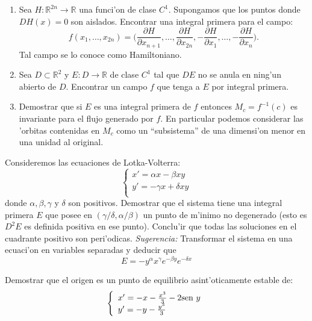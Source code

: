 \begin{ejercicio}
\begin{enumerate}
\item Sea $H:\mathbb{R}^{2n}\to\mathbb{R}$ una funci'on de clase
$C^1$. Supongamos que los puntos donde $DH(x)=0$ son aislados.
Encontrar una integral primera para el campo:
\[
    f(x_1,\ldots,x_{2n})= \bigg(\frac{\partial H}{\partial
    x_{n+1}},\ldots, \frac{\partial H}{\partial x_{2n}},
    -\frac{\partial H}{\partial x_{1}},\ldots,
    -\frac{\partial H}{\partial x_{n}} \bigg).
\]
Tal campo se lo conoce como Hamiltoniano.

\item Sea $D\subset\mathbb{R}^2$ y $E:D\to\mathbb{R}$  de clase
$C^1$ tal que $DE$ no se anula en ning'un abierto de $D$.
Encontrar un campo $f$ que tenga a $E$ por integral primera.


\item Demostrar que si $E$ es una integral primera de $f$ entonces
$M_c=f^{-1}(c)$ es invariante para el flujo generado por $f$. En
particular podemos considerar las 'orbitas contenidas en $M_c$
como un ``subsistema'' de una dimensi'on menor en una unidad al
original.



\end{enumerate}


\end{ejercicio}


\begin{ejercicio} Consideremos las ecuaciones de Lotka-Volterra:
\[
    \left\{%
\begin{array}{ll}
    x'=\alpha x-\beta x y\\
    y'=-\gamma x + \delta x y\\
\end{array}%
\right.
\]
donde $\alpha, \beta,\gamma$ y $ \delta$ son positivos. Demostrar
que el sistema tiene una integral primera $E$ que posee en
$(\gamma/\delta, \alpha/\beta)$
 un punto de m'inimo no degenerado (esto es $D^2E$ es definida
 positiva en ese punto). Conclu'ir que todas las soluciones en el
 cuadrante positivo son peri'odicas. \emph{Sugerencia:}
 Transformar el sistema en una ecuaci'on en variables separadas y
 deducir que
 \[
    E=-y^{\alpha}x^{\gamma}e^{-\beta y}e^{-\delta x}
 \]
\end{ejercicio}
\begin{ejercicio} Demostrar que el origen es un punto de
equilibrio asint'oticamente estable de:
\[
    \left\{%
\begin{array}{ll}
    x'=-x-\frac{x^3}{3}-2\hbox{sen }y \\
    y'=-y-\frac{y^3}{3}\\
\end{array}%
\right.
\]

\end{ejercicio}

